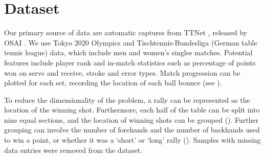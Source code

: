 \section{Dataset} \label{sec:dataset}
Our primary source of data are automatic captures from TTNet \cite{voeikov2020ttnet}, released by OSAI \cite{OSAI}. We use Tokyo 2020 Olympics and Tischtennis-Bundesliga (German table tennis league) data, which include men and women's singles matches. Potential features include player  rank and in-match statistics such as percentage of points won on serve and receive, stroke  and error types. Match progression can be plotted for each set, recording the location of each ball bounce (see ).


To reduce the dimensionality of the problem, a rally can be represented as the location of the winning shot. Furthermore, each half of the table can be split into nine equal sections, and the location of winning shots can be grouped (). Further grouping can involve the number of forehands and the number of backhands used to win a point, or whether it was a `short' or `long' rally (). %
Samples with missing data entries were removed from the dataset.

 
